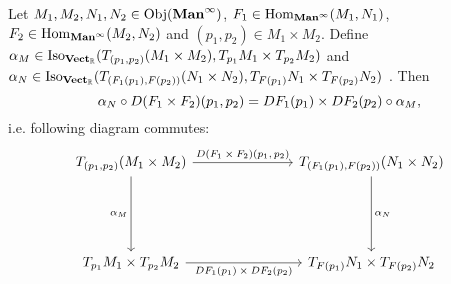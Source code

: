 \documentclass{book}
\begin{document}
	\begin{ex}
		Let $M_1, M_2, N_1, N_2 \in \operatorname{Obj}(\operatorname*{\text{\textbf{Man}}^{\infty}})$, $F_1 \in \operatorname{Hom}_{\operatorname*{\text{\textbf{Man}}^{\infty}}}(M_1, N_1)$, $F_2 \in \operatorname{Hom}_{\operatorname*{\text{\textbf{Man}}^{\infty}}}(M_2, N_2)$ and $(p_1, p_2) \in M_1 \times M_2$. Define $\alpha_M \in \operatorname{Iso}_{\operatorname*{\text{\textbf{Vect}}_{\mathbb{R}}}}(T_{(p_1, p_2)}(M_1 \times M_2), T_{p_1}M_1 \times T_{p_2}M_2)$ and $\alpha_N \in \operatorname{Iso}_{\operatorname*{\text{\textbf{Vect}}_{\mathbb{R}}}}(T_{(F_1(p_1), F(p_2))}(N_1 \times N_2), T_{F(p_1)}N_1 \times T_{F(p_2)}N_2)$ . Then 
		$$\alpha_N \circ D(F_1 \times F_2)(p_1, p_2) = DF_1(p_1) \times DF_2(p_2) \circ \alpha_M,$$ i.e. following diagram commutes: 
		\[ 
		\begin{tikzcd}
			\text{$T_{(p_1, p_2)}(M_1 \times M_2)$} \arrow[ddd, "\al_M"'] \arrow[rrr, "\text{$D(F_1 \times F_2)(p_1, p_2)$}"] &&&  \text{$T_{(F_1(p_1), F(p_2))}(N_1 \times N_2)$} \arrow[ddd, "\al_N"] \\
			& \\
			& \\
			\text{$T_{p_1}M_1 \times T_{p_2}M_2$} \arrow[rrr, "\text{$DF_1(p_1) \times DF_2(p_2)$}"'] &&&  \text{$T_{F(p_1)}N_1 \times T_{F(p_2)}N_2$}
		\end{tikzcd}
		\] 
	\end{ex}
\end{document}
